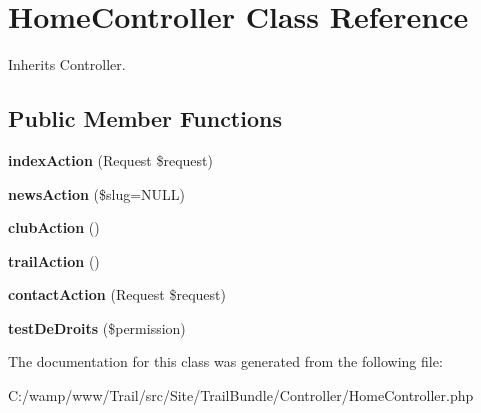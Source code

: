 \hypertarget{class_site_1_1_trail_bundle_1_1_controller_1_1_home_controller}{}\section{Home\+Controller Class Reference}
\label{class_site_1_1_trail_bundle_1_1_controller_1_1_home_controller}


Inherits Controller.

\subsection*{Public Member Functions}
\begin{DoxyCompactItemize}
\item 
\hypertarget{class_site_1_1_trail_bundle_1_1_controller_1_1_home_controller_ad6baab2738493c17ffcbf45130e919d5}{}{\bfseries index\+Action} (Request \$request)\label{class_site_1_1_trail_bundle_1_1_controller_1_1_home_controller_ad6baab2738493c17ffcbf45130e919d5}

\item 
\hypertarget{class_site_1_1_trail_bundle_1_1_controller_1_1_home_controller_affcf1d5d65e68165025039ed266f7146}{}{\bfseries news\+Action} (\$slug=N\+U\+L\+L)\label{class_site_1_1_trail_bundle_1_1_controller_1_1_home_controller_affcf1d5d65e68165025039ed266f7146}

\item 
\hypertarget{class_site_1_1_trail_bundle_1_1_controller_1_1_home_controller_abe38b38556b044164f906c796b51ab55}{}{\bfseries club\+Action} ()\label{class_site_1_1_trail_bundle_1_1_controller_1_1_home_controller_abe38b38556b044164f906c796b51ab55}

\item 
\hypertarget{class_site_1_1_trail_bundle_1_1_controller_1_1_home_controller_a437d8c202e6a1e23dc2cffc605119baa}{}{\bfseries trail\+Action} ()\label{class_site_1_1_trail_bundle_1_1_controller_1_1_home_controller_a437d8c202e6a1e23dc2cffc605119baa}

\item 
\hypertarget{class_site_1_1_trail_bundle_1_1_controller_1_1_home_controller_aefe3846127557f21471960a91707dff4}{}{\bfseries contact\+Action} (Request \$request)\label{class_site_1_1_trail_bundle_1_1_controller_1_1_home_controller_aefe3846127557f21471960a91707dff4}

\item 
\hypertarget{class_site_1_1_trail_bundle_1_1_controller_1_1_home_controller_a49387e8719305355ba3fae06b0b9bc2a}{}{\bfseries test\+De\+Droits} (\$permission)\label{class_site_1_1_trail_bundle_1_1_controller_1_1_home_controller_a49387e8719305355ba3fae06b0b9bc2a}

\end{DoxyCompactItemize}


The documentation for this class was generated from the following file\+:\begin{DoxyCompactItemize}
\item 
C\+:/wamp/www/\+Trail/src/\+Site/\+Trail\+Bundle/\+Controller/Home\+Controller.\+php\end{DoxyCompactItemize}

